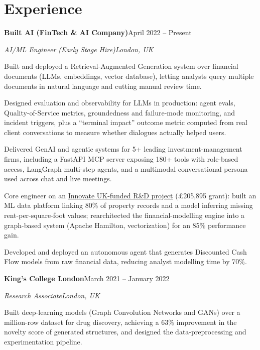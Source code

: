 \documentclass[10pt,a4paper]{article}
\newcommand{\entry}[4]{%
  {\color{company}\bfseries #1}\hfill {\color{muted}#2}\par
  \vspace{1pt}
  {\itshape #3}\hfill {\color{muted}\itshape #4}\par
  \vspace{3pt}%
}
\begin{document}
\section{Experience}
\entry{Built AI (FinTech \& AI Company)}{April 2022 -- Present}{AI/ML Engineer (Early Stage Hire)}{London, UK}
\begin{tight}
  \item Built and deployed a Retrieval-Augmented Generation system over financial documents (LLMs, embeddings, vector database), letting analysts query multiple documents in natural language and cutting manual review time.
  \item Designed evaluation and observability for LLMs in production: agent evals, Quality-of-Service metrics, groundedness and failure-mode monitoring, and incident triggers, plus a ``terminal impact'' outcome metric computed from real client conversations to measure whether dialogues actually helped users.
  \item Delivered GenAI and agentic systems for 5+ leading investment-management firms, including a FastAPI MCP server exposing 180+ tools with role-based access, LangGraph multi-step agents, and a multimodal conversational persona used across chat and live meetings.
  \item Core engineer on an \href{https://gtr.ukri.org/projects?ref=10022996}{Innovate UK-funded R\&D project} (\pounds205,895 grant): built an ML data platform linking 80\% of property records and a model inferring missing rent-per-square-foot values; rearchitected the financial-modelling engine into a graph-based system (Apache Hamilton, vectorization) for an 85\% performance gain.
  \item Developed and deployed an autonomous agent that generates Discounted Cash Flow models from raw financial data, reducing analyst modelling time by 70\%.
\end{tight}

\entry{King's College London}{March 2021 -- January 2022}{Research Associate}{London, UK}
\begin{tight}
  \item Built deep-learning models (Graph Convolution Networks and GANs) over a million-row dataset for drug discovery, achieving a 63\% improvement in the novelty score of generated structures, and designed the data-preprocessing and experimentation pipeline.
\end{tight}

\end{document}
